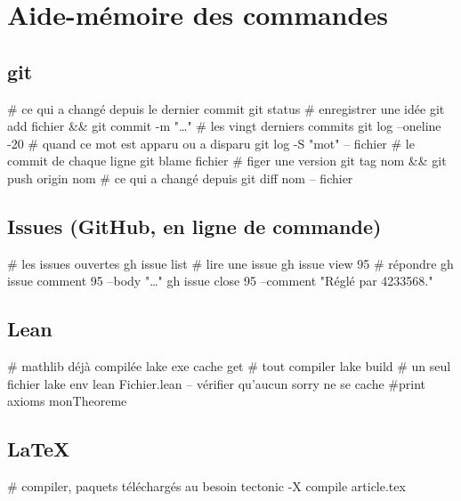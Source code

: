 \chapter{Aide-mémoire des commandes}

\section*{git}
\begin{terminal}
# ce qui a changé depuis le dernier commit
git status
# enregistrer une idée
git add fichier && git commit -m "…"
# les vingt derniers commits
git log --oneline -20
# quand ce mot est apparu ou a disparu
git log -S "mot" -- fichier
# le commit de chaque ligne
git blame fichier
# figer une version
git tag nom && git push origin nom
# ce qui a changé depuis
git diff nom -- fichier
\end{terminal}

\section*{Issues (GitHub, en ligne de commande)}
\begin{terminal}
# les issues ouvertes
gh issue list
# lire une issue
gh issue view 95
# répondre
gh issue comment 95 --body "…"
gh issue close 95 --comment "Réglé par 4233568."
\end{terminal}

\section*{Lean}
\begin{terminal}
# mathlib déjà compilée
lake exe cache get
# tout compiler
lake build
# un seul fichier
lake env lean Fichier.lean
-- vérifier qu'aucun sorry ne se cache
#print axioms monTheoreme
\end{terminal}

\section*{LaTeX}
\begin{terminal}
# compiler, paquets téléchargés au besoin
tectonic -X compile article.tex
\end{terminal}
